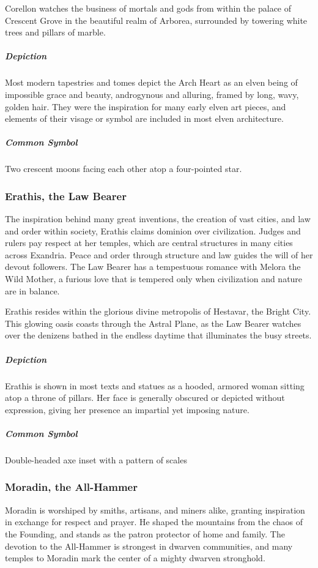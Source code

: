 \documentclass[letterpaper, twocolumn, openany, nodeprecatedcode, layout=true]{dndbook}
\begin{document}
Corellon watches the business of mortals and gods from within the palace of Crescent
Grove in the beautiful realm of Arborea, surrounded by towering white trees and
pillars of marble.

\subparagraph{Depiction}
Most modern tapestries and tomes depict the Arch Heart as an elven being of impossible
grace and beauty, androgynous and alluring, framed by long, wavy, golden hair. They were
the inspiration for many early elven art pieces, and elements of their visage or symbol
are included in most elven architecture.

\subparagraph{Common Symbol}
Two crescent moons facing each other atop a four-pointed star.

\subsubsection{Erathis, the Law Bearer}

The inspiration behind many great inventions, the creation of vast cities, and law and
order within society, Erathis claims dominion over civilization. Judges and rulers pay
respect at her temples, which are central structures in many cities across Exandria.
Peace and order through structure and law guides the will of her devout followers.
The Law Bearer has a tempestuous romance with Melora the Wild Mother, a furious love
that is tempered only when civilization and nature are in balance.

Erathis resides within the glorious divine metropolis of Hestavar, the Bright City.
This glowing oasis coasts through the Astral Plane, as the Law Bearer watches over the
denizens bathed in the endless daytime that illuminates the busy streets.

\subparagraph{Depiction}
Erathis is shown in most texts and statues as a hooded, armored woman sitting atop a
throne of pillars. Her face is generally obscured or depicted without expression,
giving her presence an impartial yet imposing nature.

\subparagraph{Common Symbol}
Double-headed axe inset with a pattern of scales

\subsubsection{Moradin, the All-Hammer}

Moradin is worshiped by smiths, artisans, and miners alike, granting inspiration in
exchange for respect and prayer. He shaped the mountains from the chaos of the Founding,
and stands as the patron protector of home and family. The devotion to the All-Hammer is
strongest in dwarven communities, and many temples to Moradin mark the center of a mighty
dwarven stronghold.
\end{document}
